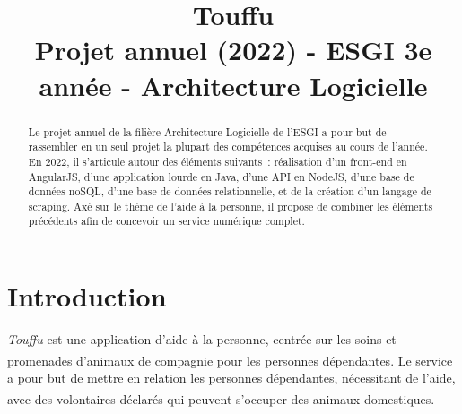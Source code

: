 \documentclass[conference]{IEEEtran}
\newcommand{\bibRef}[1]
{\textsuperscript{\cite{#1}}}
\begin{document}
\title{
Touffu\\
{\footnotesize
Projet annuel (2022) - ESGI 3e année - Architecture Logicielle}
}

\author{
\and
{}
\and
{}
}

\maketitle

\begin{abstract}
Le projet annuel de la filière Architecture Logicielle de l'ESGI a pour but de rassembler en un seul projet la plupart des compétences acquises au cours de l'année. En 2022, il s'articule autour des éléments suivants : réalisation d'un front-end en AngularJS, d'une application lourde en Java, d'une API en NodeJS, d'une base de données noSQL, d'une base de données relationnelle, et de la création d'un langage de scraping. Axé sur le thème de l'aide à la personne, il propose de combiner les éléments précédents afin de concevoir un service numérique complet.
\end{abstract}

\section{Introduction}

\textit{Touffu} est une application d'aide à la personne, centrée sur les soins et promenades d'animaux de compagnie pour les personnes dépendantes\bibRef{Soins aux animaux}. Le service a pour but de mettre en relation les personnes dépendantes, nécessitant de l'aide, avec des volontaires déclarés qui peuvent s'occuper des animaux domestiques\bibRef{Animaux domestiques}.\\
\end{document}

